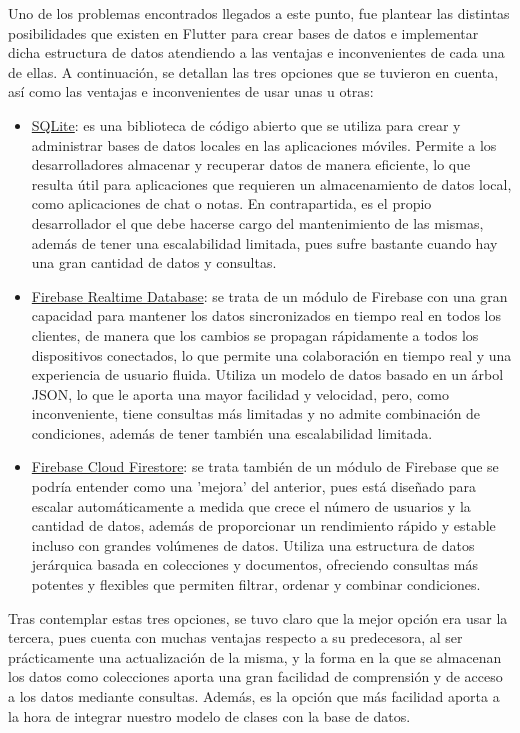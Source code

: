 \documentclass{article}
\begin{document}
Uno de los problemas encontrados llegados a este punto, fue plantear las distintas posibilidades que existen en Flutter para crear bases de datos e implementar dicha estructura de datos atendiendo a las ventajas e inconvenientes de cada una de ellas. A continuación, se detallan las tres opciones que se tuvieron en cuenta, así como las ventajas e inconvenientes de usar unas u otras:

\begin{itemize}
    \item \underline{SQLite}: es una biblioteca de código abierto que se utiliza para crear y administrar bases de datos locales en las aplicaciones móviles. Permite a los desarrolladores almacenar y recuperar datos de manera eficiente, lo que resulta útil para aplicaciones que requieren un almacenamiento de datos local, como aplicaciones de chat o notas. En contrapartida, es el propio desarrollador el que debe hacerse cargo del mantenimiento de las mismas, además de tener una escalabilidad limitada, pues sufre bastante cuando hay una gran cantidad de datos y consultas. 
    \item \underline{Firebase Realtime Database}: se trata de un módulo de Firebase con una gran capacidad para mantener los datos sincronizados en tiempo real en todos los clientes, de manera que los cambios se propagan rápidamente a todos los dispositivos conectados, lo que permite una colaboración en tiempo real y una experiencia de usuario fluida. Utiliza un modelo de datos basado en un árbol JSON, lo que le aporta una mayor facilidad y velocidad, pero, como inconveniente, tiene consultas más limitadas y no admite combinación de condiciones, además de tener también una escalabilidad limitada.
    \item \underline{Firebase Cloud Firestore}: se trata también de un módulo de Firebase que se podría entender como una 'mejora' del anterior, pues está diseñado para escalar automáticamente a medida que crece el número de usuarios y la cantidad de datos, además de proporcionar un rendimiento rápido y estable incluso con grandes volúmenes de datos. Utiliza una estructura de datos jerárquica basada en colecciones y documentos, ofreciendo consultas más potentes y flexibles que permiten filtrar, ordenar y combinar condiciones.
\end{itemize}

Tras contemplar estas tres opciones, se tuvo claro que la mejor opción era usar la tercera, pues cuenta con muchas ventajas respecto a su predecesora, al ser prácticamente una actualización de la misma, y la forma en la que se almacenan los datos como colecciones aporta una gran facilidad de comprensión y de acceso a los datos mediante consultas. Además, es la opción que más facilidad aporta a la hora de integrar nuestro modelo de clases con la base de datos.
\end{document}
